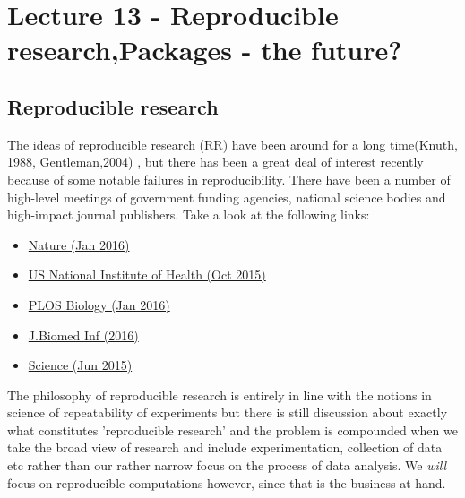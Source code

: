 \documentclass[titlepage]{book}\usepackage{knitr}
\begin{document}





\chapter{ Lecture 13 - Reproducible research,Packages - the future?}

\author{Brian Williams $<$\href{mailto:bjw649@gmail.com}%
{bjw649@gmail.com}$>$}


\section{Reproducible research}

The ideas of reproducible research (RR) have been around for a long time(Knuth, 1988, Gentleman,2004) \cite{Knuth1984, Gentleman2004}, but there has been a great deal of interest recently because of some notable failures in reproducibility.  There have been a number of high-level meetings of government funding agencies, national science bodies and high-impact journal publishers. Take a look at the following links:

\begin{itemize}

\item{\href{http://www.nature.com/news/repetitive-flaws-1.19192}{Nature (Jan 2016)}}
\item{\href{http://grants.nih.gov/grants/guide/notice-files/NOT-OD-16-011.html}{US National Institute of Health (Oct 2015)}}
\item{\href{http://journals.plos.org/plosbiology/article?id=10.1371/journal.pbio.1002334}{PLOS Biology (Jan 2016)}}
\item{\href{http://www.journals.elsevier.com/journal-of-biomedical-informatics/call-for-papers/call-for-papers-reproducible-research-for-biomedical-informa/}{J.Biomed Inf (2016)}}
\item{\href{http://www.sciencemag.org/news/2015/06/study-claims-28-billion-year-spent-irreproducible-biomedical-research}{Science (Jun 2015)}}

\end{itemize}

The philosophy of reproducible research is entirely in line with the notions in science of repeatability of experiments but there is still discussion about exactly what constitutes 'reproducible research' and the problem is compounded when we take the broad view of research and include experimentation, collection of data etc rather than our rather narrow focus on the process of data analysis. We \emph{will} focus on reproducible computations however, since that is the business at hand.
\end{document}
